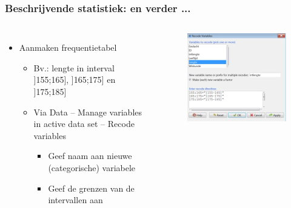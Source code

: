\documentclass{beamer}
\begin{document}
\begin{frame}
  \frametitle{Beschrijvende statistiek: en verder ...}

  \begin{columns}[c]

    \begin{itemize}
      \item Aanmaken frequentietabel
        \begin{itemize}
        \item Bv.: lengte in interval ]155;165], ]165;175] en ]175;185]
        \item Via Data -- Manage variables in active data set -- Recode variables
          \begin{itemize}
            \item Geef naam aan nieuwe (categorische) variabele
            \item Geef de grenzen van de intervallen aan
          \end{itemize}
      \end{itemize}
  \end{itemize}

  \begin{figure}
    \centering
    \includegraphics[width=\textwidth]{img/oef3/recode}
  \end{figure}

\end{columns}
\end{frame}
\end{document}

